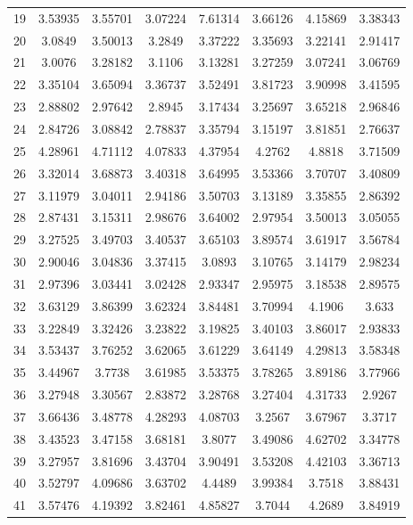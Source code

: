 \begin{center}
\begin{longtable}{cccccccc}
19 & 3.53935 & 3.55701 & 3.07224 & 7.61314 & 3.66126 & 4.15869 & 3.38343\\
20 & 3.0849 & 3.50013 & 3.2849 & 3.37222 & 3.35693 & 3.22141 & 2.91417\\
21 & 3.0076 & 3.28182 & 3.1106 & 3.13281 & 3.27259 & 3.07241 & 3.06769\\
22 & 3.35104 & 3.65094 & 3.36737 & 3.52491 & 3.81723 & 3.90998 & 3.41595\\
23 & 2.88802 & 2.97642 & 2.8945 & 3.17434 & 3.25697 & 3.65218 & 2.96846\\
24 & 2.84726 & 3.08842 & 2.78837 & 3.35794 & 3.15197 & 3.81851 & 2.76637\\
25 & 4.28961 & 4.71112 & 4.07833 & 4.37954 & 4.2762 & 4.8818 & 3.71509\\
26 & 3.32014 & 3.68873 & 3.40318 & 3.64995 & 3.53366 & 3.70707 & 3.40809\\
27 & 3.11979 & 3.04011 & 2.94186 & 3.50703 & 3.13189 & 3.35855 & 2.86392\\
28 & 2.87431 & 3.15311 & 2.98676 & 3.64002 & 2.97954 & 3.50013 & 3.05055\\
29 & 3.27525 & 3.49703 & 3.40537 & 3.65103 & 3.89574 & 3.61917 & 3.56784\\
30 & 2.90046 & 3.04836 & 3.37415 & 3.0893 & 3.10765 & 3.14179 & 2.98234\\
31 & 2.97396 & 3.03441 & 3.02428 & 2.93347 & 2.95975 & 3.18538 & 2.89575\\
32 & 3.63129 & 3.86399 & 3.62324 & 3.84481 & 3.70994 & 4.1906 & 3.633\\
33 & 3.22849 & 3.32426 & 3.23822 & 3.19825 & 3.40103 & 3.86017 & 2.93833\\
34 & 3.53437 & 3.76252 & 3.62065 & 3.61229 & 3.64149 & 4.29813 & 3.58348\\
35 & 3.44967 & 3.7738 & 3.61985 & 3.53375 & 3.78265 & 3.89186 & 3.77966\\
36 & 3.27948 & 3.30567 & 2.83872 & 3.28768 & 3.27404 & 4.31733 & 2.9267\\
37 & 3.66436 & 3.48778 & 4.28293 & 4.08703 & 3.2567 & 3.67967 & 3.3717\\
38 & 3.43523 & 3.47158 & 3.68181 & 3.8077 & 3.49086 & 4.62702 & 3.34778\\
39 & 3.27957 & 3.81696 & 3.43704 & 3.90491 & 3.53208 & 4.42103 & 3.36713\\
40 & 3.52797 & 4.09686 & 3.63702 & 4.4489 & 3.99384 & 3.7518 & 3.88431\\
41 & 3.57476 & 4.19392 & 3.82461 & 4.85827 & 3.7044 & 4.2689 & 3.84919\\

\end{longtable}
\end{center}
